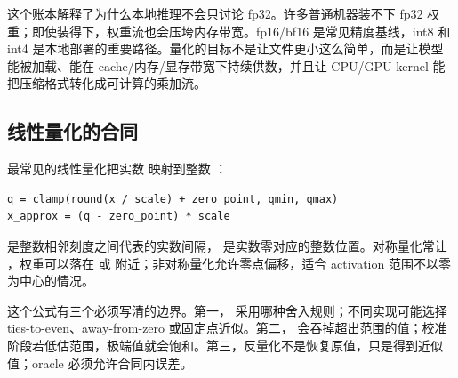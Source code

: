 这个账本解释了为什么本地推理不会只讨论 fp32。许多普通机器装不下 fp32 权重；即使装得下，权重流也会压垮内存带宽。fp16/bf16 是常见精度基线，int8 和 int4 是本地部署的重要路径。量化的目标不是让文件更小这么简单，而是让模型能被加载、能在 cache/内存/显存带宽下持续供数，并且让 CPU/GPU kernel 能把压缩格式转化成可计算的乘加流。

\subsection{线性量化的合同}

最常见的线性量化把实数  映射到整数 ：

\begin{lstlisting}[numbers=none,caption={线性量化合同}]
q = clamp(round(x / scale) + zero_point, qmin, qmax)
x_approx = (q - zero_point) * scale
\end{lstlisting}

 是整数相邻刻度之间代表的实数间隔， 是实数零对应的整数位置。对称量化常让 ，权重可以落在  或  附近；非对称量化允许零点偏移，适合 activation 范围不以零为中心的情况。

这个公式有三个必须写清的边界。第一， 采用哪种舍入规则；不同实现可能选择 ties-to-even、away-from-zero 或固定点近似。第二， 会吞掉超出范围的值；校准阶段若低估范围，极端值就会饱和。第三，反量化不是恢复原值，只是得到近似值；oracle 必须允许合同内误差。

